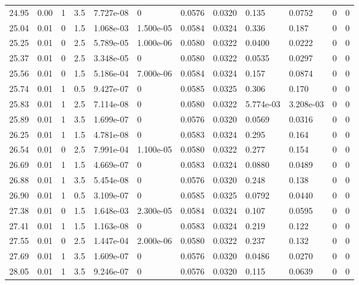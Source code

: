 \documentclass[preview]{standalone}
\begin{document}
{{{{{\begin{tabular}{L{1.2cm}C{1.2cm} C{0.3cm}C{0.5cm} C{1.4cm}C{1.4cm} C{1.4cm}C{1.4cm} C{1.6cm}C{1.6cm} C{1.6cm}C{1.6cm}}
  24.95  &  0.00  & 1     & 3.5 &  7.727e-08  & 0  &  0.0576&   0.0320& 0.135 & 0.0752   &  0 & 0  \\ 
  25.04  &  0.01  & 0     & 1.5 &  1.068e-03  & 1.500e-05  &  0.0584&   0.0324& 0.336 & 0.187   &  0 & 0  \\ 
  25.25  &  0.01  & 0     & 2.5 &  5.789e-05  & 1.000e-06  &  0.0580&   0.0322& 0.0400 & 0.0222   &  0 & 0  \\ 
  25.37  &  0.01  & 0     & 2.5 &  3.348e-05  & 0  &  0.0580&   0.0322& 0.0535 & 0.0297   &  0 & 0  \\ 
  25.56  &  0.01  & 0     & 1.5 &  5.186e-04  & 7.000e-06  &  0.0584&   0.0324& 0.157 & 0.0874   &  0 & 0  \\ 
  25.74  &  0.01  & 1     & 0.5 &  9.427e-07  & 0  &  0.0585&   0.0325& 0.306 & 0.170   &  0 & 0  \\ 
  25.83  &  0.01  & 1     & 2.5 &  7.114e-08  & 0  &  0.0580&   0.0322& 5.774e-03 & 3.208e-03   &  0 & 0  \\ 
  25.89  &  0.01  & 1     & 3.5 &  1.699e-07  & 0  &  0.0576&   0.0320& 0.0569 & 0.0316   &  0 & 0  \\ 
  26.25  &  0.01  & 1     & 1.5 &  4.781e-08  & 0  &  0.0583&   0.0324& 0.295 & 0.164   &  0 & 0  \\ 
  26.54  &  0.01  & 0     & 2.5 &  7.991e-04  & 1.100e-05  &  0.0580&   0.0322& 0.277 & 0.154   &  0 & 0  \\ 
  26.69  &  0.01  & 1     & 1.5 &  4.669e-07  & 0  &  0.0583&   0.0324& 0.0880 & 0.0489   &  0 & 0  \\ 
  26.88  &  0.01  & 1     & 3.5 &  5.454e-08  & 0  &  0.0576&   0.0320& 0.248 & 0.138   &  0 & 0  \\ 
  26.90  &  0.01  & 1     & 0.5 &  3.109e-07  & 0  &  0.0585&   0.0325& 0.0792 & 0.0440   &  0 & 0  \\ 
  27.38  &  0.01  & 0     & 1.5 &  1.648e-03  & 2.300e-05  &  0.0584&   0.0324& 0.107 & 0.0595   &  0 & 0  \\ 
  27.41  &  0.01  & 1     & 1.5 &  1.163e-08  & 0  &  0.0583&   0.0324& 0.219 & 0.122   &  0 & 0  \\ 
  27.55  &  0.01  & 0     & 2.5 &  1.447e-04  & 2.000e-06  &  0.0580&   0.0322& 0.237 & 0.132   &  0 & 0  \\ 
  27.69  &  0.01  & 1     & 3.5 &  1.609e-07  & 0  &  0.0576&   0.0320& 0.0486 & 0.0270   &  0 & 0  \\ 
  28.05  &  0.01  & 1     & 3.5 &  9.246e-07  & 0  &  0.0576&   0.0320& 0.115 & 0.0639   &  0 & 0  \\ 

\end{tabular}}}}}}
\end{document}
